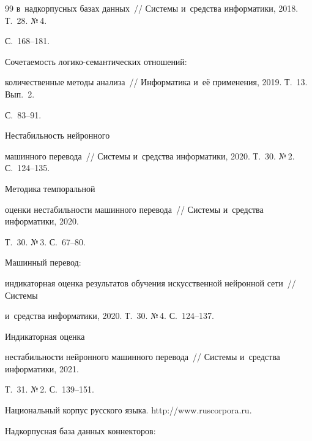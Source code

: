 {{\begin{thebibliography}{99}
в~надкорпусных базах данных~/\!\!/ Системы и~средства информатики, 2018. Т.~28. №\,4.  


С.~168--181.







 Сочетаемость ло\-ги\-ко-се\-ман\-ти\-че\-ских отношений: 


количественные методы анализа~/\!\!/ Информатика и~её применения, 2019. Т.~13. Вып.~2.  


С.~83--91.




 Нестабильность нейронного 


машинного перевода~/\!\!/ Системы и~средства информатики, 2020. Т.~30. №\,2. С.~124--135.




 Методика темпоральной 


оценки нестабильности машинного перевода~/\!\!/ Системы и~средства информатики, 2020. 


Т.~30. №\,3. С.~67--80.




 Машинный перевод: 


индикаторная оценка результатов обучения искусственной нейронной сети~/\!\!/ Системы 


и~средства информатики, 2020. Т.~30. №\,4. С.~124--137.




 Индикаторная оценка 


нестабильности нейронного машинного перевода~/\!\!/ Системы и~средства информатики, 2021. 


Т.~31. №\,2. С.~139--151.




Национальный корпус русского языка. {\sf http://www.ruscorpora.ru}.







 Надкорпусная база данных коннекторов: 



\end{thebibliography}}}
